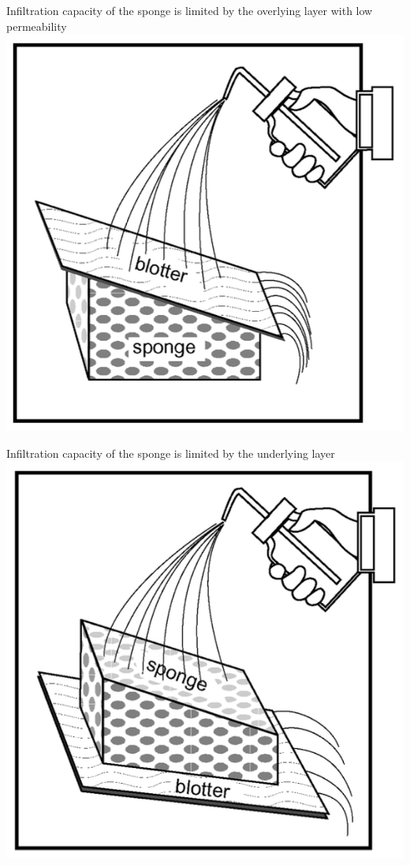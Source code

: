 \documentclass[
  letterpaper,
  DIV=11,
  numbers=noendperiod]{scrreprt}
\begin{document}
Infiltration capacity of the sponge is limited by the overlying layer
with low permeability
\includegraphics{archive/figures/ward_and_trimble_infiltration_capacity3.png}

Infiltration capacity of the sponge is limited by the underlying layer
\includegraphics{archive/figures/ward_and_trimble_infiltration_capacity4.png}
\end{document}

